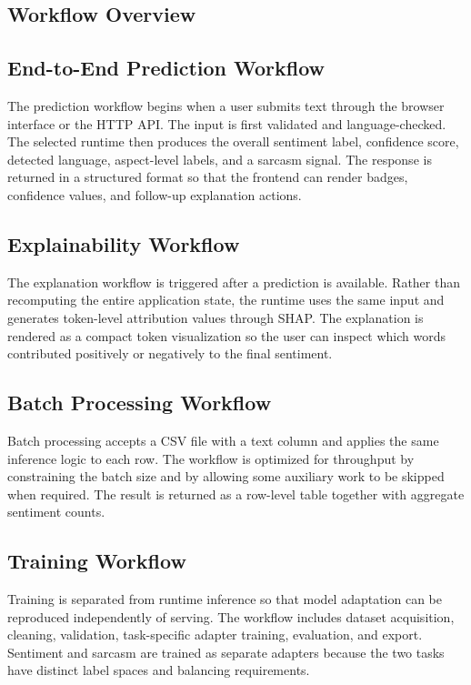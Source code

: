 \documentclass[12pt, a4paper]{article}
\begin{document}
\subsection{Workflow Overview}
\subsection{End-to-End Prediction Workflow}
The prediction workflow begins when a user submits text through the browser interface or the HTTP API. The input is first validated and language-checked. The selected runtime then produces the overall sentiment label, confidence score, detected language, aspect-level labels, and a sarcasm signal. The response is returned in a structured format so that the frontend can render badges, confidence values, and follow-up explanation actions.

\subsection{Explainability Workflow}
The explanation workflow is triggered after a prediction is available. Rather than recomputing the entire application state, the runtime uses the same input and generates token-level attribution values through SHAP. The explanation is rendered as a compact token visualization so the user can inspect which words contributed positively or negatively to the final sentiment.

\subsection{Batch Processing Workflow}
Batch processing accepts a CSV file with a text column and applies the same inference logic to each row. The workflow is optimized for throughput by constraining the batch size and by allowing some auxiliary work to be skipped when required. The result is returned as a row-level table together with aggregate sentiment counts.

\subsection{Training Workflow}
Training is separated from runtime inference so that model adaptation can be reproduced independently of serving. The workflow includes dataset acquisition, cleaning, validation, task-specific adapter training, evaluation, and export. Sentiment and sarcasm are trained as separate adapters because the two tasks have distinct label spaces and balancing requirements.
\end{document}
